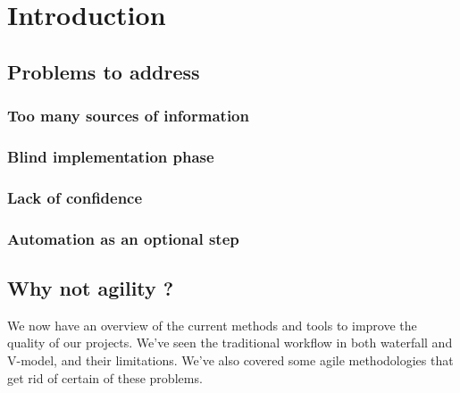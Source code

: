 \section{Introduction}\label{sec:introduction}

\subsection{Problems to address}\label{subsec:problems-to-address}


\subsubsection{Too many sources of information}

\subsubsection{Blind implementation phase}

\subsubsection{Lack of confidence}

\subsubsection{Automation as an optional step}

\subsection{Why not agility ?}\label{subsec:why-not-agility}


We now have an overview of the current methods and tools to improve the
quality of our projects.
We've seen the traditional workflow in both waterfall and V-model, and their
limitations.
We've also covered some agile methodologies that get rid of certain of these
problems.

